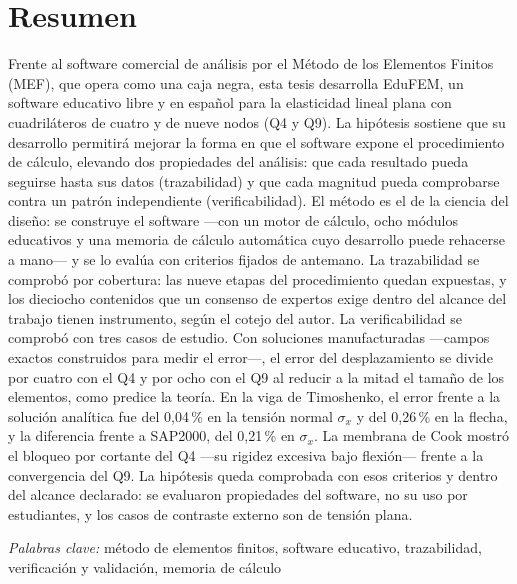 \chapter*{Resumen}

\noindent Frente al software comercial de análisis por el Método de los Elementos Finitos (MEF), que opera como una caja negra, esta tesis desarrolla EduFEM, un software educativo libre y en español para la elasticidad lineal plana con cuadriláteros de cuatro y de nueve nodos (Q4 y Q9). La hipótesis sostiene que su desarrollo permitirá mejorar la forma en que el software expone el procedimiento de cálculo, elevando dos propiedades del análisis: que cada resultado pueda seguirse hasta sus datos (trazabilidad) y que cada magnitud pueda comprobarse contra un patrón independiente (verificabilidad). El método es el de la ciencia del diseño: se construye el software ---con un motor de cálculo, ocho módulos educativos y una memoria de cálculo automática cuyo desarrollo puede rehacerse a mano--- y se lo evalúa con criterios fijados de antemano. La trazabilidad se comprobó por cobertura: las nueve etapas del procedimiento quedan expuestas, y los dieciocho contenidos que un consenso de expertos exige dentro del alcance del trabajo tienen instrumento, según el cotejo del autor. La verificabilidad se comprobó con tres casos de estudio. Con soluciones manufacturadas ---campos exactos construidos para medir el error---, el error del desplazamiento se divide por cuatro con el Q4 y por ocho con el Q9 al reducir a la mitad el tamaño de los elementos, como predice la teoría. En la viga de Timoshenko, el error frente a la solución analítica fue del 0,04\,\% en la tensión normal $\sigma_x$ y del 0,26\,\% en la flecha, y la diferencia frente a SAP2000, del 0,21\,\% en $\sigma_x$. La membrana de Cook mostró el bloqueo por cortante del Q4 ---su rigidez excesiva bajo flexión--- frente a la convergencia del Q9. La hipótesis queda comprobada con esos criterios y dentro del alcance declarado: se evaluaron propiedades del software, no su uso por estudiantes, y los casos de contraste externo son de tensión plana.

\textit{Palabras clave:} método de elementos finitos, software educativo, trazabilidad, verificación y validación, memoria de cálculo
